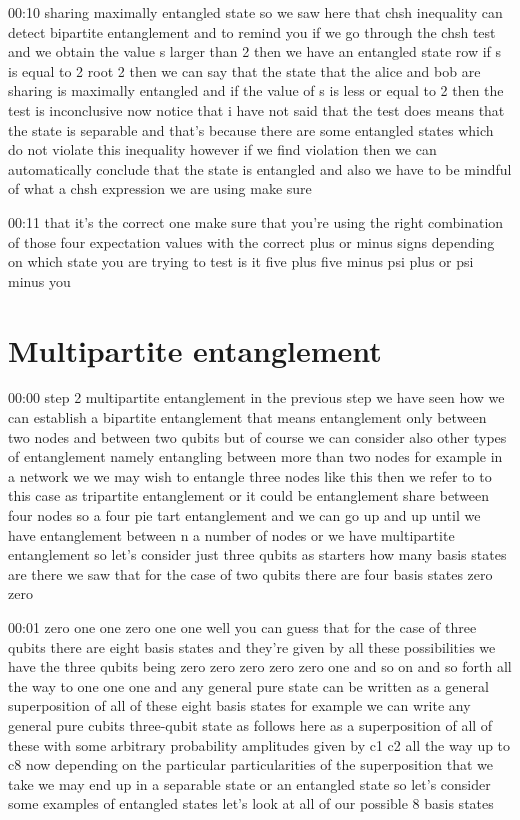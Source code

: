 00:10
sharing maximally entangled state so we saw here that chsh inequality can detect
bipartite entanglement and to remind you if we go through the chsh test and we
obtain the value s larger than 2 then we have an entangled state
row if s is equal to 2 root 2 then we can say that the state that the
alice and bob are sharing is maximally entangled and if the
value of s is less or equal to 2 then the test is inconclusive
now notice that i have not said that the test does
means that the state is separable and that's because
there are some entangled states which do not violate this inequality
however if we find violation then we can
automatically conclude that the state is entangled
and also we have to be mindful of what a chsh expression we are using make sure

00:11
that it's the correct one make sure that you're using the right
combination of those four expectation values with the correct plus or minus
signs depending on which state you are trying to test is it five plus
five minus psi plus or psi minus you

\section{Multipartite entanglement}

00:00
step 2 multipartite entanglement in the previous step we have seen how
we can establish a bipartite entanglement that means entanglement only between
two nodes and between two qubits but of course we can consider also other
types of entanglement namely entangling between more than two nodes for example
in a network we we may wish to entangle three nodes like this
then we refer to to this case as tripartite entanglement
or it could be entanglement share between four nodes
so a four pie tart entanglement and we can go up and up
until we have entanglement between n a number of nodes or we have
multipartite entanglement so let's consider just three qubits
as starters how many basis states are there
we saw that for the case of two qubits there are four basis states zero zero

00:01
zero one one zero one one well you can guess that for the case of three qubits
there are eight basis states and they're
given by all these possibilities we have the three qubits being zero zero zero
zero zero one and so on and so forth all the way to one one
one and any general pure state can be written as a general superposition of
all of these eight basis states for example we can write any general pure
cubits three-qubit state as follows here as a superposition of all of these with
some arbitrary probability amplitudes given by c1 c2 all the way up to c8
now depending on the particular particularities of the superposition
that we take we may end up in a separable state or an entangled state
so let's consider some examples of entangled states
let's look at all of our possible 8 basis states

